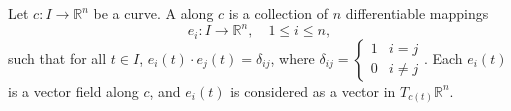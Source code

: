 Let $c: I \rightarrow \mathbb{R}^n$ be a curve. A  along $c$ is a collection of $n$ differentiable mappings $$e_i: I \rightarrow \mathbb{R}^n, \quad 1 \leq i \leq n,$$ such that for all $t \in I$, $e_i(t) \cdot e_j(t) = \delta_{ij}$, where $\delta_{ij} = \begin{cases} 1 & i=j \\ 0 & i \neq j \end{cases}$. Each $e_i(t)$ is a vector field along $c$, and $e_i(t)$ is considered as a vector in $T_{c(t)}\mathbb{R}^n$.
